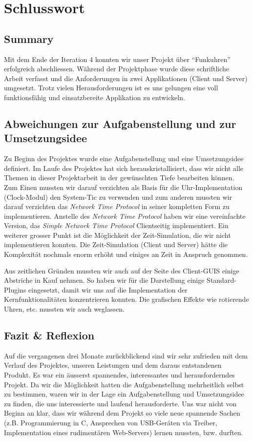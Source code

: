 
\chapter{Schlusswort}
\label{chap:Schlusswort}

\section{Summary}
Mit dem Ende der Iteration 4 konnten wir unser Projekt über "`Funkuhren"' erfolgreich abschliessen. Während der Projektphase wurde diese schriftliche Arbeit verfasst und die Anforderungen in zwei Applikationen (Client und Server) umgesetzt. Trotz vielen Herausforderungen ist es uns gelungen eine voll funktionsfähig und einsatzbereite Applikation zu entwickeln.

\section{Abweichungen zur Aufgabenstellung und zur Umsetzungsidee}
Zu Beginn des Projektes wurde eine Aufgabenstellung und eine Umsetzungsidee definiert. Im Laufe des Projektes hat sich herauskristallisiert, dass wir nicht alle Themen in dieser Projektarbeit in der gewünschten Tiefe bearbeiten können. Zum Einen mussten wir darauf verzichten als Basis für die Uhr-Implementation (Clock-Modul) den System-Tic zu verwenden und zum anderen mussten wir darauf verzichten das \textit{Network Time Protocol} in seiner kompletten Form zu implementieren. Anstelle des \textit{Network Time Protocol} haben wir eine vereinfachte Version, das \textit{Simple Network Time Protocol} Clientseitig implementiert. Ein weiterer grosser Punkt ist die Möglichkeit der Zeit-Simulation, die wir nicht implementieren konnten. Die Zeit-Simulation (Client und Server) hätte die Komplexität nochmals enorm erhöht und einiges an Zeit in Anspruch genommen.

Aus zeitlichen Gründen mussten wir auch auf der Seite des Client-GUIS einige Abstriche in Kauf nehmen. So haben wir für die Darstellung einige Standard-Plugins eingesetzt, damit wir uns auf die Implementation der Kernfunktionalitäten konzentrieren konnten. Die grafischen Effekte wie rotierende Uhren, etc. mussten wir auch weglassen.


\section{Fazit \& Reflexion}
Auf die vergangenen drei Monate zurückblickend sind wir sehr zufrieden mit dem Verlauf des Projektes, unseren Leistungen und dem daraus entstandenen Produkt. Es war ein äusserst spannendes, interessantes und herausforderndes Projekt. Da wir die Möglichkeit hatten die Aufgabenstellung mehrheitlich selbst zu bestimmen, waren wir in der Lage ein Aufgabenstellung und Umsetzungsidee zu finden, die uns interessierte und laufend herausforderte. Uns war nicht von Beginn an klar, dass wir während dem Projekt so viele neue spannende Sachen (z.B. Programmierung in C, Ansprechen von USB-Geräten via Treiber, Implementation eines rudimentären Web-Servers) lernen mussten, bzw. durften.

